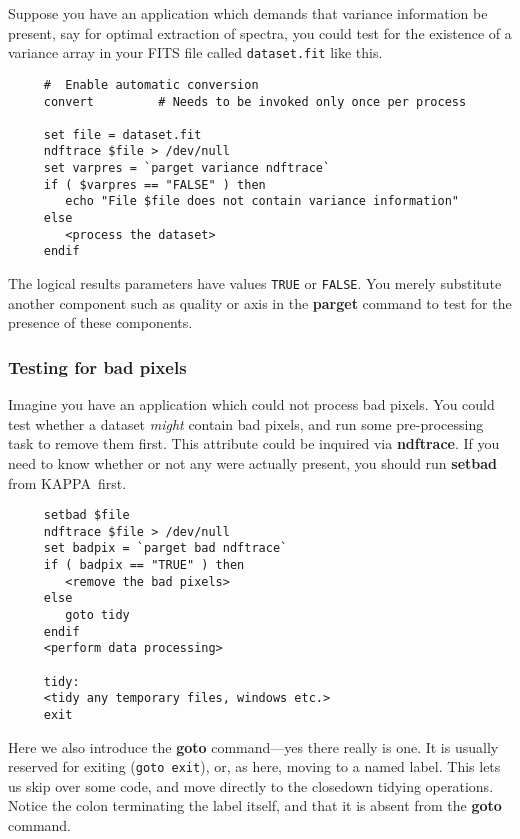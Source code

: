 \documentclass[twoside,11pt]{article}
\newcommand{\htmlref}[2]{#1}
\newcommand{\xref}[3]{#1}
\newcommand{\xlabel}[1]{}
\newcommand{\KAPPAref}{\xref{{\footnotesize KAPPA}}{sun95}{}}
\begin{document}
Suppose you have an application which demands that variance information
be present, say for optimal extraction of spectra, you could test for
the existence of a variance array in your \htmlref{{\sf
FITS}}{sc4_gl_fits} file called {\tt dataset.fit} like this.

\small
\begin{verbatim}
     #  Enable automatic conversion
     convert         # Needs to be invoked only once per process
     
     set file = dataset.fit
     ndftrace $file > /dev/null
     set varpres = `parget variance ndftrace`
     if ( $varpres == "FALSE" ) then
        echo "File $file does not contain variance information"
     else
        <process the dataset>
     endif
\end{verbatim}
\normalsize
The logical results parameters have values {\tt TRUE} or {\tt FALSE}\@.
You merely substitute another component such as quality or axis in the
\xref{{\bf parget}}{sun95}{PARGET} command to test for the presence of
these components.

\subsubsection{\xlabel{sc4_se_dataset_badpix}Testing for bad pixels
\label{sc4_se_dataset_badpix}}

Imagine you have an application which could not process bad pixels.
You could test whether a dataset {\em might\/} contain bad pixels, and
run some pre-processing task to remove them first.  This attribute
could be inquired via \xref{{\bf ndftrace}}{sun95}{NDFTRACE}.  If you
need to know whether or not any were actually present, you should run
\xref{{\bf setbad}}{sun95}{SETBAD} from \KAPPAref\ first.

\small
\begin{verbatim}
     setbad $file
     ndftrace $file > /dev/null
     set badpix = `parget bad ndftrace`
     if ( badpix == "TRUE" ) then
        <remove the bad pixels>
     else
        goto tidy
     endif
     <perform data processing>
     
     tidy:
     <tidy any temporary files, windows etc.>
     exit
\end{verbatim}
\normalsize
Here we also introduce the {\bf goto} command---yes there really is
one.  It is usually reserved for exiting ({\tt goto exit}), or, as here,
moving to a named label.  This lets us skip over some code, and move
directly to the closedown tidying operations.  Notice the colon
terminating the label itself, and that it is absent from the {\bf goto}
command.
\end{document}
